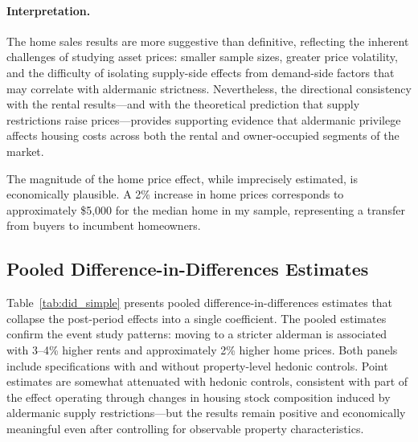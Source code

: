 \paragraph{Interpretation.} The home sales results are more suggestive than definitive, reflecting the inherent challenges of studying asset prices: smaller sample sizes, greater price volatility, and the difficulty of isolating supply-side effects from demand-side factors that may correlate with aldermanic strictness. Nevertheless, the directional consistency with the rental results---and with the theoretical prediction that supply restrictions raise prices---provides supporting evidence that aldermanic privilege affects housing costs across both the rental and owner-occupied segments of the market.

The magnitude of the home price effect, while imprecisely estimated, is economically plausible. A 2\% increase in home prices corresponds to approximately \$5,000 for the median home in my sample, representing a transfer from buyers to incumbent homeowners.

\subsection{Pooled Difference-in-Differences Estimates}

Table~\ref{tab:did_simple} presents pooled difference-in-differences estimates that collapse the post-period effects into a single coefficient. The pooled estimates confirm the event study patterns: moving to a stricter alderman is associated with 3--4\% higher rents and approximately 2\% higher home prices. Both panels include specifications with and without property-level hedonic controls. Point estimates are somewhat attenuated with hedonic controls, consistent with part of the effect operating through changes in housing stock composition induced by aldermanic supply restrictions---but the results remain positive and economically meaningful even after controlling for observable property characteristics.


